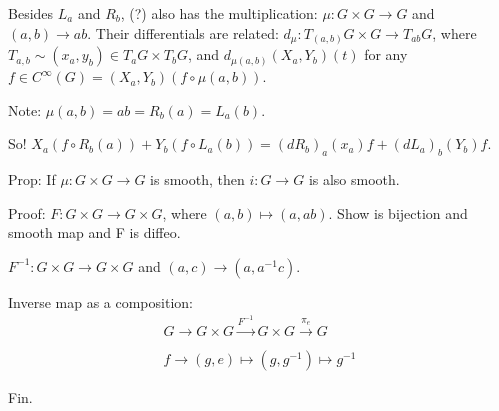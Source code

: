 \documentclass[12pt,letterpaper]{article}
\begin{document}
Besides $L_a$ and $R_b$, (?) also has the multiplication: $\mu : G\times G \rightarrow G$ and $(a,b) \rightarrow ab$. Their differentials are related: $d_{\mu}: T_{(a,b)} G\times G \rightarrow T_{ab} G$, where $T_{a,b} \sim (x_a, y_b) \in T_a G \times T_b G$, and $d_{\mu(a,b)}(X_a, Y_b)(t)$ for any $f \in C^{\infty}(G) = (X_a, Y_b)(f \circ \mu (a,b))$.

Note: $\mu(a,b) = ab = R_b(a) = L_a(b)$.

So! $X_a (f \circ R_b(a)) + Y_b(f \circ L_a(b)) = (dR_b)_a(x_a) f + (dL_a)_b(Y_b)f$.

Prop: If $ \mu: G \times G \rightarrow G$ is smooth, then $i : G \rightarrow G$ is also smooth.

Proof: $F: G \times G \rightarrow G \times G$, where $(a,b) \mapsto (a, ab)$. Show is bijection and smooth map and F is diffeo. 

$F^{-1}: G \times G \rightarrow G \times G$ and $(a,c) \rightarrow (a, a^{-1}c)$. 

Inverse map as a composition:
\begin{align*}
    G \rightarrow G\times G \xrightarrow[]{F^{-1}} G \times G \xrightarrow[]{\pi_e} G \\
    f \rightarrow (g,e) \mapsto (g, g^{-1}) \mapsto g^{-1}
\end{align*}

Fin.
\end{document}

